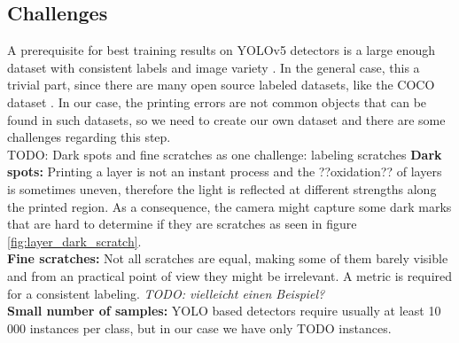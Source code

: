 \subsection{Challenges}
A prerequisite for best training results on YOLOv5 detectors is a large enough dataset with consistent labels and image variety \cite{yolov5_train_tips}. In the general case, this a trivial part, since there are many open source labeled datasets, like the COCO dataset \cite{coco}. In our case, the printing errors are not common objects that can be found in such datasets, so we need to create our own dataset and there are some challenges regarding this step.\\
TODO: Dark spots and fine scratches as one challenge: labeling scratches
\textbf{Dark spots:} Printing a layer is not an instant process and the ??oxidation?? of layers is sometimes uneven, therefore the light is reflected at different strengths along the printed region. As a consequence, the camera might capture some dark marks that are hard to determine if they are scratches as seen in figure \ref{fig:layer_dark_scratch}.\\
\textbf{Fine scratches:} Not all scratches are equal, making some of them barely visible and from an practical point of view they might be irrelevant. A metric is required for a consistent labeling. \textit{TODO: vielleicht einen Beispiel?}\\
\textbf{Small number of samples:} YOLO based detectors require usually at least 10 000 instances per class, but in our case we have only TODO instances.


